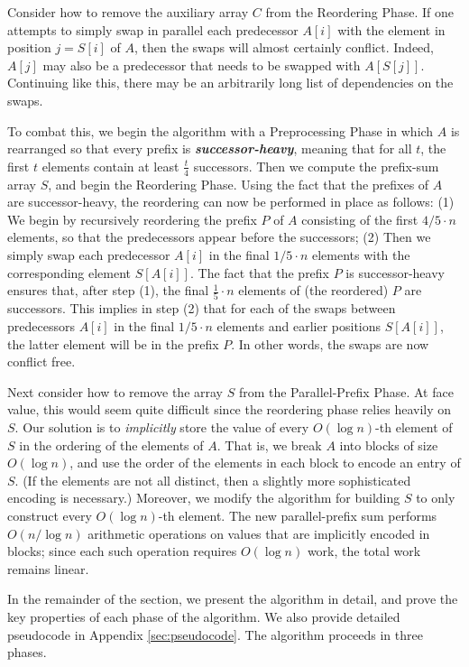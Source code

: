 \documentclass[twoside,leqno,twocolumn]{article}
\newcommand{\defn}[1]{{\textit{\textbf{\boldmath #1}}}}
\begin{document}
Consider how to remove the auxiliary array $C$ from the Reordering
Phase. If one attempts to simply swap in parallel each predecessor
$A[i]$ with the element in position $j = S[i]$ of $A$, then the swaps
will almost certainly conflict. Indeed, $A[j]$ may also be a
predecessor that needs to be swapped with $A[S[j]]$. Continuing like
this, there may be an arbitrarily long list of dependencies on the
swaps.

To combat this, we begin the algorithm with a Preprocessing Phase in
which $A$ is rearranged so that every prefix is
\defn{successor-heavy}, meaning that for all $t$, the first $t$
elements contain at least $\frac{t}{4}$ successors. Then we compute
the prefix-sum array $S$, and begin the Reordering Phase. Using the
fact that the prefixes of $A$ are successor-heavy, the reordering can
now be performed in place as follows: (1) We begin by recursively
reordering the prefix $P$ of $A$ consisting of the first $4/5 \cdot n$
elements, so that the predecessors appear before the successors; (2)
Then we simply swap each predecessor $A[i]$ in the final $1/5 \cdot n$
elements with the corresponding element $S[A[i]]$. The fact that the
prefix $P$ is successor-heavy ensures that, after step (1), the final 
$\frac{1}{5} \cdot n$ elements of (the reordered) $P$ are successors. 
This implies in step (2) that for each of the swaps between predecessors $A[i]$
in the final $1/5 \cdot n$ elements and earlier positions $S[A[i]]$, the latter
element will be in the prefix $P$. In other words, the swaps are now conflict
free.

Next consider how to remove the array $S$ from the Parallel-Prefix
Phase. At face value, this would seem quite difficult since the
reordering phase relies heavily on $S$. Our solution is to
\emph{implicitly} store the value of every $O(\log n)$-th element of
$S$ in the ordering of the elements of $A$. That is, we break $A$ into
blocks of size $O(\log n)$, and use the order of the elements in each
block to encode an entry of $S$. (If the elements are not all
  distinct, then a slightly more sophisticated encoding is necessary.)
Moreover, we modify the algorithm for building $S$ to only construct
every $O(\log n)$-th element. The new parallel-prefix sum performs
$O(n / \log n)$ arithmetic operations on values that are implicitly
encoded in blocks; since each such operation requires $O(\log n)$
work, the total work remains linear.

In the remainder of the section, we present the algorithm in detail,
and prove the key properties of each phase of the algorithm. We also
provide detailed pseudocode in Appendix \ref{sec:pseudocode}. The
algorithm proceeds in three phases.
\end{document}

